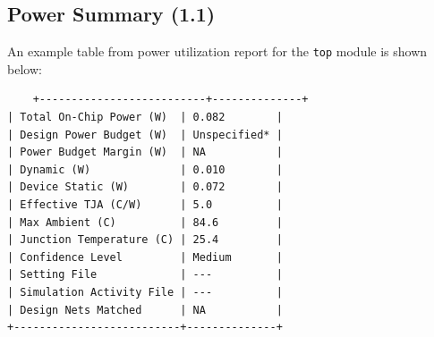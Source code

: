\documentclass{report}
\begin{document}
\subsection{Power Summary (1.1)}
An example table from power utilization report for the \texttt{top} module is shown below:

\begin{verbatim}
    +--------------------------+--------------+
| Total On-Chip Power (W)  | 0.082        |
| Design Power Budget (W)  | Unspecified* |
| Power Budget Margin (W)  | NA           |
| Dynamic (W)              | 0.010        |
| Device Static (W)        | 0.072        |
| Effective TJA (C/W)      | 5.0          |
| Max Ambient (C)          | 84.6         |
| Junction Temperature (C) | 25.4         |
| Confidence Level         | Medium       |
| Setting File             | ---          |
| Simulation Activity File | ---          |
| Design Nets Matched      | NA           |
+--------------------------+--------------+
\end{verbatim}
\end{document}
